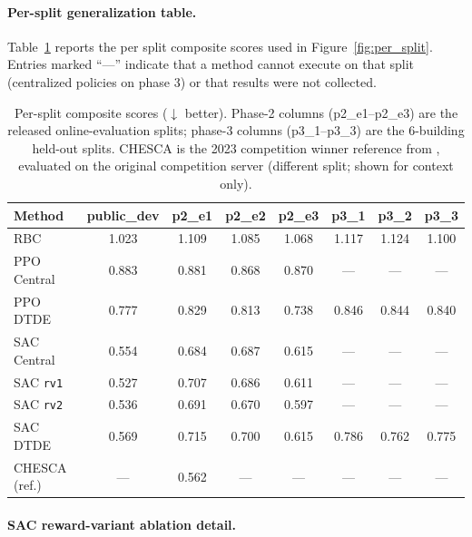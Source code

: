 \documentclass{article}
\begin{document}
\paragraph{Per-split generalization table.}

Table~\ref{tab:cross_split} reports the per split composite scores used in Figure~\ref{fig:per_split}. Entries marked ``---'' indicate that a method cannot execute on that split (centralized policies on phase 3) or that results were not collected.

\begin{table}[h]
\centering
\small
\begin{tabular}{lccccccc}
\toprule
\textbf{Method} & \textbf{public\_dev} & \textbf{p2\_e1} & \textbf{p2\_e2} & \textbf{p2\_e3} & \textbf{p3\_1} & \textbf{p3\_2} & \textbf{p3\_3} \\
\midrule
RBC                & 1.023 & 1.109 & 1.085 & 1.068 & 1.117 & 1.124 & 1.100 \\
PPO Central        & 0.883 & 0.881 & 0.868 & 0.870 & --- & --- & --- \\
PPO DTDE           & 0.777 & 0.829 & 0.813 & 0.738 & 0.846 & 0.844 & 0.840 \\
SAC Central        & 0.554 & 0.684 & 0.687 & 0.615 & --- & --- & --- \\
SAC \texttt{rv1}   & 0.527 & 0.707 & 0.686 & 0.611 & --- & --- & --- \\
SAC \texttt{rv2}   & 0.536 & 0.691 & 0.670 & 0.597 & --- & --- & --- \\
SAC DTDE           & 0.569 & 0.715 & 0.700 & 0.615 & 0.786 & 0.762 & 0.775 \\
\midrule
CHESCA (ref.)      & --- & 0.562 & --- & --- & --- & --- & --- \\
\bottomrule
\end{tabular}
\caption{Per-split composite scores ($\downarrow$ better). Phase-2 columns (p2\_e1--p2\_e3) are the released online-evaluation splits; phase-3 columns (p3\_1--p3\_3) are the 6-building held-out splits. CHESCA is the 2023 competition winner reference from \citet{pinto2024citylearn}, evaluated on the original competition server (different split; shown for context only).}
\label{tab:cross_split}
\end{table}

\paragraph{SAC reward-variant ablation detail.}
\end{document}
